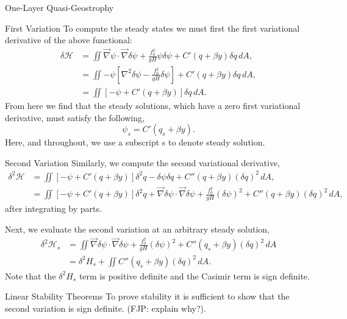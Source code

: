 \documentclass[12pt]{article}
\begin{document}
\begin{section}{One-Layer Quasi-Geostrophy}
    \begin{subsection}{First Variation}
        To compute the steady states we must first the first variational derivative of the above functional:
        \begin{align*}
            \delta \mathcal{H}
            & = \iint \vec\nabla\psi \cdot \vec\nabla \delta \psi + \frac{f_0^2}{g H} \psi \delta \psi + C'(q + \beta y) \delta q \, dA, \\
            & = \iint -\psi \left[ \nabla^2 \delta \psi - \frac{f_0^2}{g H} \delta \psi \right]  + C'(q + \beta y) \delta q \, dA, \\
            & = \iint \left[ - \psi + C'(q + \beta y) \right]  \delta q  \, dA.
        \end{align*}
        From here we find that the steady solutions, which have a zero first variational derivative, must satisfy the following,
        $$
        \psi_s = C'(q_s + \beta y).
        $$
        Here, and throughout, we use a subscript s to denote steady solution.
    \end{subsection}

    \begin{subsection}{Second Variation}
      Similarly, we compute the second variational derivative,
      \begin{align*}
          \delta^2 \mathcal{H}
          & = \iint \left[ - \psi + C'(q + \beta y) \right]  \delta^2 q  - \delta \psi \delta q +  C''(q + \beta y) (\delta q)^2  \, dA, \\
          & = \iint \left[ - \psi + C'(q + \beta y) \right]  \delta^2 q
          + \vec\nabla \delta \psi \cdot \vec \nabla \delta \psi
          +\frac{f_0^2}{gH} (\delta \psi)^2+  C''(q + \beta y) (\delta q)^2  \, dA,
      \end{align*}
      after integrating by parts.

      Next, we evaluate the second variation at an arbitrary steady solution,
      \begin{align*}
          \delta^2 \mathcal{H}_s
          & = \iint \vec\nabla \delta \psi \cdot \vec \nabla \delta \psi + \frac{f_0^2}{gH} (\delta \psi)^2+  C''(q_s + \beta y) (\delta q)^2  \, dA \\
          & = \delta^2 H_s + \iint C''(q_s + \beta y) (\delta q)^2  \, dA.
      \end{align*}
      Note that the $\delta^2 H_s$ term is positive definite and the Casimir term is sign definite.
    \end{subsection}
    \begin{subsection}{Linear Stability Theorems}
        To prove stability it is sufficient to show that the second variation is sign definite. (FJP: explain why?).


\end{subsection}
\end{section}
\end{document}
